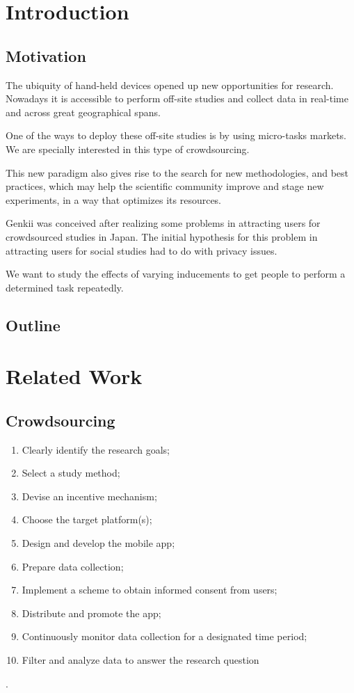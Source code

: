 \documentclass[letterpaper]{article}
\begin{document}
\section{Introduction}

\subsection{Motivation}



The ubiquity of hand-held devices opened up new opportunities for research. Nowadays it is accessible to perform off-site studies and collect data in real-time and across great geographical spans.

One of the ways to deploy these off-site studies is by using micro-tasks markets. We are specially interested in this type of crowdsourcing.

This new paradigm also gives rise to the search for new methodologies, and best practices, which may help the scientific community improve and stage new experiments, in a way that optimizes its resources.



Genkii was conceived after realizing some problems in attracting users for crowdsourced studies in Japan. The initial hypothesis for this problem in attracting users for social studies had to do with privacy issues.

We want to study the effects of varying inducements to get people to perform a determined task repeatedly.

\subsection{Outline}

\section{Related Work}
\subsection{Crowdsourcing}




\begin{enumerate}
		
\item Clearly identify the research goals; \item Select a study method; \item Devise an incentive mechanism;  \item Choose the target platform(s); \item Design and develop the mobile app; \item Prepare data collection; \item Implement a scheme to obtain informed consent from users; \item Distribute and promote the app; \item Continuously monitor data collection for a designated time period; \item Filter and analyze data to answer the research question
\end{enumerate} 
\cite{Henze2013}.
\end{document}
